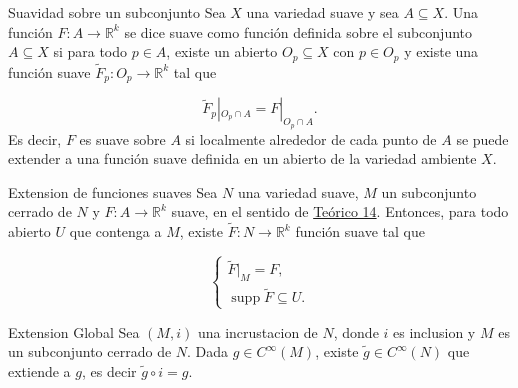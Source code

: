 \label{blk:f11484}
\begin{bookdefinition}{Suavidad sobre un subconjunto}
Sea $X$ una variedad suave y sea $A\subseteq X$. Una función $F:A\to \mathbb R^k$ se dice suave como función definida sobre el subconjunto $A\subseteq X$ si para todo $p\in A$, existe un abierto $O_p\subseteq X$ con $p\in O_p$ y existe una función suave $\widetilde F_p:O_p\to \mathbb R^k$ tal que

\[
\widetilde F_p|_{O_p\cap A}=F|_{O_p\cap A}.
\]
Es decir, $F$ es suave sobre $A$ si localmente alrededor de cada punto de $A$ se puede extender a una función suave definida en un abierto de la variedad ambiente $X$.

\end{bookdefinition}
\label{blk:c5f3d4}
\begin{bookproposition}{Extension de funciones suaves}
Sea $N$ una variedad suave, $M$ un subconjunto cerrado de $N$ y $F:A\to\mathbb{R}^k$ suave, en el sentido de \hyperref[blk:c5f3d4]{Teórico 14}. Entonces, para todo abierto $U$ que contenga a $M$, existe $\widetilde F:N\to\mathbb{R}^k$ función suave tal que

\[
\begin{cases}\widetilde F|_M=F,\\\operatorname{supp}\widetilde F\subseteq U.\end{cases}
\]
\end{bookproposition}
\label{blk:81237c}
\begin{bookproposition}{Extension Global}
Sea $(M,i)$ una incrustacion de $N$, donde $i$ es inclusion y $M$ es un subconjunto cerrado de $N$. Dada $g \in C^\infty(M)$, existe $\widetilde g \in C^\infty(N)$ que extiende a $g$, es decir $\widetilde g \circ i=g$.

\end{bookproposition}
